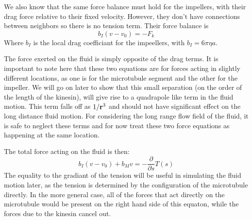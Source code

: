\documentclass[11pt]{ucthesis}
\def\br{{\bf r}}
\begin{document}
We also know that the same force balance must hold for the impellers, with their drag force relative to their fixed velocity. 
However, they don't have connections between neighbors so there is no tension term. 
Their force balance is 
\begin{equation}
\label{eq:mfnetIforce}
b_I (v - v_0) =  -F_k
\end{equation}
Where $b_I$ is the local drag coefficiant for the impeellers, with $b_I = 6\pi\eta a$.

The force exerted on the fluid is simply opposite of the drag terms. It is important to note here that these two equations are for forces acting in slightly different locations, as one is for the microtubule segment and the other for the impeller. 
We will go on later to show that this small separation (on the order of the length of the kinesin), will give rise to a quadrapole like term in the fluid motion.
This term falls off as $1/\br^3$ and should not have significant effect on the long distance fluid motion.
For considering the long range flow field of the fluid, it is safe to neglect these terms and for now treat these two force equations as happening at the same location.

The total force acting on the fluid is then:
\begin{equation}
\label{eq:mfnetFforce}
b_I (v - v_0) + b_M v = -\frac{\partial}{\partial s}T(s)
\end{equation}
The equality to the gradiant of the tension will be useful in simulating the fluid motion later, as the tension is determined by the configuration of the microtubule directly. 
In the more general case, all of the forces that act directly on the microtubule would be present on the right hand side of this equaton, while the forces due to the kinesin cancel out.
\end{document}
